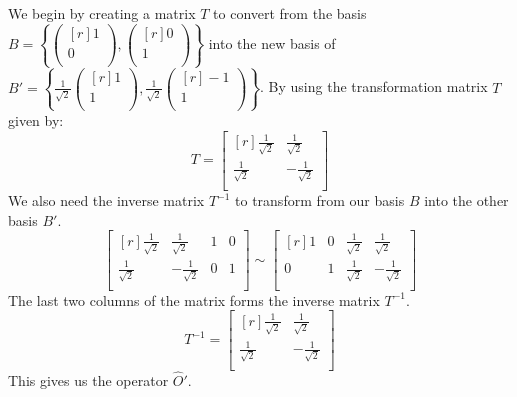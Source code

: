 \documentclass{article}
\begin{document}
We begin by creating a matrix $T$ to convert from the basis  $B =  \left\{\begin{pmatrix*}[r]
 1 \\
 0 \\
\end{pmatrix*}, \begin{pmatrix*}[r]
 0 \\
 1 \\
\end{pmatrix*}\right\}$ 
into the new basis of $B' = \left\{\frac{1}{\sqrt{2}} \begin{pmatrix*}[r]
 1 \\
 1 \\
\end{pmatrix*}, \frac{1}{\sqrt{2}} \begin{pmatrix*}[r]
 -1 \\
 1 \\
\end{pmatrix*}\right\}$.
By using the transformation matrix $T$ given by: 
\[
T = 
\begin{bmatrix*}[r]
 \frac{1}{\sqrt{2}} & \frac{1}{\sqrt{2}}  \\
 \frac{1}{\sqrt{2}} & -\frac{1}{\sqrt{2}}  \\
\end{bmatrix*}
\]
We also need the inverse matrix $T^{-1}$ to transform from our basis $B$ into the other basis $B'$. 
\[
\begin{bmatrix*}[r]
    \frac{1}{\sqrt{2}} & \frac{1}{\sqrt{2}} & 1 & 0 \\
    \frac{1}{\sqrt{2}} & -\frac{1}{\sqrt{2}} & 0 & 1 \\
\end{bmatrix*} ∼ 
\begin{bmatrix*}[r]
 1 & 0 & \frac{1}{\sqrt{2}} & \frac{1}{\sqrt{2}} \\
 0 & 1 & \frac{1}{\sqrt{2}} & -\frac{1}{\sqrt{2}} \\
\end{bmatrix*}
\]
The last two columns of the matrix forms the inverse matrix $T^{-1}$.
\[
T^{-1} = 
\begin{bmatrix*}[r]
    \frac{1}{\sqrt{2}} & \frac{1}{\sqrt{2}} \\
    \frac{1}{\sqrt{2}} & -\frac{1}{\sqrt{2}} \\
\end{bmatrix*}
\]
This gives us the operator $\hat{O}'$.
\end{document}

